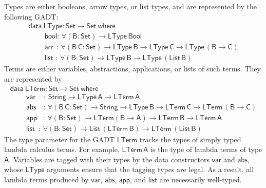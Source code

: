 \documentclass[9pt]{entcs}
\begin{document}
Types are either booleans, arrow types, or list types, and are
represented by the following GADT:
\begin{equation*}\label{eq:eq_ltype}
\begin{array}{l}
\mathsf{data\ LType : Set \to Set\ where}\\
\mathsf{\;\;\;\;\;\;\;\;bool :\, \forall (B : Set) \to LType\,Bool}\\
\mathsf{\;\;\;\;\;\;\;\;arr\,\,\, :\, \forall (B\,C : Set) \to
  LType\,B \to LType\,C \to LType\,(B \to C)}\\
\mathsf{\;\;\;\;\;\;\;\;list\,\, :\, \forall (B : Set)
  \to LType\,B \to LType\,(List\,B)}
\end{array}
\end{equation*}
Terms are either variables, abstractions, applications, or lists of
such terms. They are represented by
\begin{equation*}\label{eq:eq_lterm}
\begin{array}{l}
\mathsf{data\ LTerm : Set \to Set\ where}\\
\mathsf{\;\;\;\;\;\;\;\;var\,\,\,\,\,\,\,:\, String \to LType\,A \to
  LTerm\,A} \\  
\mathsf{\;\;\;\;\;\;\;\;abs\,\,\,\,\,\, :\, \forall (B\,C : Set) \to
  String \to LType\,B \to LTerm\,C \to
  LTerm\,(B \to C)}\\ 
  \mathsf{\;\;\;\;\;\;\;\;app\,\,\,\,\, :\, \forall (B : Set) \to
    LTerm (B \to A) \to LTerm\,B \to LTerm\,A} \\ 
  \mathsf{\;\;\;\;\;\;\;\;list\,\,\, :\, \forall (B : Set) \to
    List\,(LTerm\,B) \to LTerm\,(List \,B)} 
\end{array}
\end{equation*}
The type parameter for the GADT $\mathsf{LTerm}$ tracks the types of
simply typed lambda calculus terms. For example, $\mathsf{LTerm\,A}$
is the type of lambda terms of type $\mathsf{A}$. Variables are tagged
with their types by the data constructors $\mathsf{var}$ and
$\mathsf{abs}$, whose $\mathsf{LType}$ arguments ensure that the
tagging types are legal.
As a result, all lambda terms produced by $\mathsf{var}$,
$\mathsf{abs}$, $\mathsf{app}$, and $\mathsf{list}$ are necessarily
well-typed.
\end{document}
